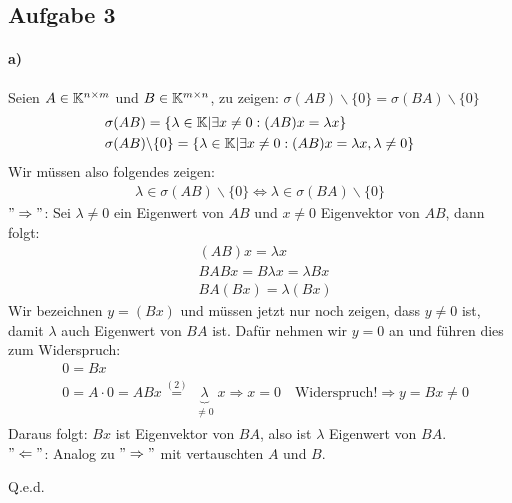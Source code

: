 \subsection*{Aufgabe 3}
\paragraph*{a)}
Seien $A \in \mathbb K^{n\times m}$ und $B \in \mathbb K^{m\times n}$,
zu zeigen: $\sigma(AB)\backslash\{0\} = \sigma(BA)\backslash\{0\}$
\begin{align*}
\begin{split}
&\sigma(AB) = \{\lambda \in \mathbb K | \exists x \neq 0: (AB)x=\lambda x\}\\
&\sigma(AB)\backslash\{0\} = \{\lambda \in \mathbb K | \exists x \neq 0: (AB)x=\lambda x, \lambda \neq 0\}\\
\end{split}
\end{align*}
Wir m\"ussen also folgendes zeigen:
\begin{align}
\lambda \in \sigma(AB)\backslash\{0\} \Leftrightarrow \lambda \in \sigma(BA)\backslash\{0\}
\end{align}
$"\Rightarrow"$: Sei $\lambda \neq 0$ ein Eigenwert von $AB$ und $x \neq 0$ Eigenvektor von $AB$, dann folgt:
\begin{align}
&(AB)x = \lambda x \\
&BABx=B\lambda x=\lambda Bx\\
&BA(Bx)=\lambda (Bx)
\end{align}
Wir bezeichnen $y=(Bx)$ und m\"ussen jetzt nur noch zeigen, dass $y\neq0$ ist, damit $\lambda$ auch Eigenwert von $BA$ ist. Daf\"ur nehmen wir $y=0$ an und f\"uhren dies zum Widerspruch:
\begin{align*}
&0=Bx\\
&0=A\cdot 0 = ABx \overset{(2)}{=} \underbrace{\lambda}_{\substack{\neq 0}} x \Rightarrow x=0 \quad\mathrm{Widerspruch!} \Rightarrow y=Bx \neq 0
\end{align*}
Daraus folgt: $Bx$ ist Eigenvektor von $BA$, also ist $\lambda$ Eigenwert von $BA$.\\
\newline
$"\Leftarrow"$: Analog zu $"\Rightarrow"$ mit vertauschten $A$ und $B$.
\begin{flushright}Q.e.d.\end{flushright}

